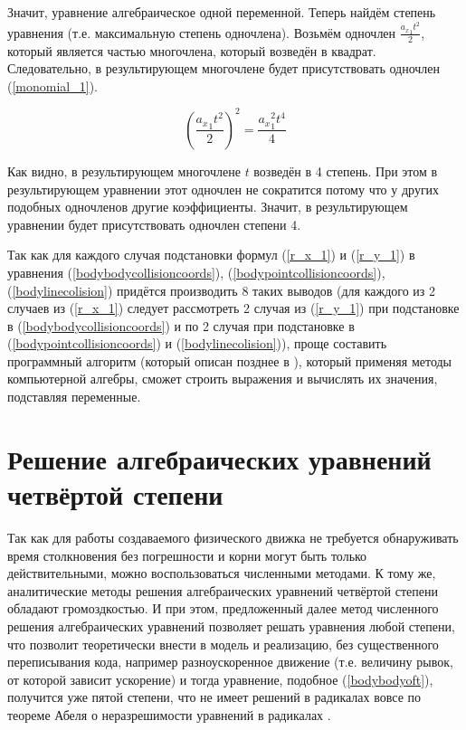 Значит, уравнение алгебраическое одной переменной.
Теперь найдём степень уравнения (т.е. максимальную степень одночлена).
Возьмём одночлен \(\frac{{a_x}_1 t^2}{2}\), который является частью многочлена, который возведён в квадрат.
Следовательно, в результирующем многочлене будет присутствовать одночлен (\ref{monomial_1}).

\begin{equation}\label{monomial_1}
  (\frac{{a_x}_1 t^2}{2})^2 = \frac{{a_x}_1^2 t^4}{4}
\end{equation}

Как видно, в результирующем многочлене \(t\) возведён в 4 степень.
При этом в результирующем уравнении этот одночлен не сократится
потому что у других подобных одночленов другие коэффициенты.
Значит, в результирующем уравнении будет присутствовать одночлен степени 4.

Так как для каждого случая подстановки формул (\ref{r_x_1}) и (\ref{r_y_1}) в уравнения
(\ref{bodybodycollisioncoords}), (\ref{bodypointcollisioncoords}), (\ref{bodylinecolision})
придётся производить 8 таких выводов
(для каждого из 2 случаев из (\ref{r_x_1}) следует рассмотреть 2 случая из (\ref{r_y_1}) при подстановке в (\ref{bodybodycollisioncoords})
и по 2 случая при подстановке в (\ref{bodypointcollisioncoords}) и (\ref{bodylinecolision})),
проще составить программный алгоритм (который описан позднее в \TODO),
который применяя методы компьютерной алгебры, сможет строить выражения и вычислять их значения, подставляя переменные.

\section{Решение алгебраических уравнений четвёртой степени}\label{solvefourthdegree}

Так как для работы создаваемого физического движка не требуется обнаруживать время столкновения
без погрешности и корни могут быть только действительными, можно воспользоваться численными методами.
К тому же, аналитические методы решения алгебраических уравнений четвёртой степени обладают громоздкостью.
И при этом, предложенный далее метод численного решения алгебраических уравнений позволяет решать уравнения любой степени,
что позволит теоретически внести в модель и реализацию, без существенного переписывания кода, например разноускоренное движение
(т.е. величину рывок, от которой зависит ускорение) и тогда уравнение, подобное (\ref{bodybodyoft}),
получится уже пятой степени, что не имеет решений в радикалах вовсе по теореме Абеля о неразрешимости уравнений в радикалах \cite[c. 112]{alekseevabel}.

